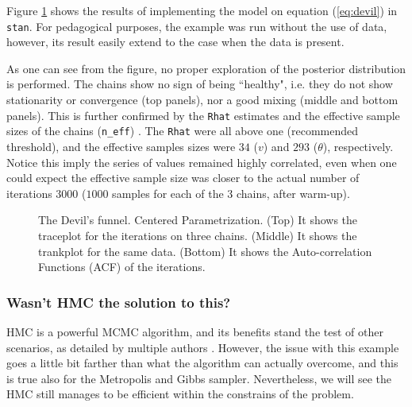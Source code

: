 Figure \ref{fig:devil_CE} shows the results of implementing the model on equation (\ref{eq:devil}) in \texttt{stan}. For pedagogical purposes, the example was run without the use of data, however, its result easily extend to the case when the data is present.

As one can see from the figure, no proper exploration of the posterior distribution is performed. The chains show no sign of being ``healthy", i.e. they do not show stationarity or convergence (top panels), nor a good mixing (middle and bottom panels). This is further confirmed by the \texttt{Rhat} estimates and the effective sample sizes of the chains (\texttt{n\_eff}) \cite{Gelman_et_al_2014}. The \texttt{Rhat} were all above one (recommended threshold), and the effective samples sizes were $34$ ($v$) and $293$ ($\theta$), respectively. Notice this imply the series of values remained highly correlated, even when one could expect the effective sample size was closer to the actual number of iterations $3000$ ($1000$ samples for each of the $3$ chains, after warm-up).
%
\begin{figure}[h]
	\centering
	\begin{subfigure}
		\texttt{[image: 1\_trace\_CE\_simple]}
	\end{subfigure}
	\begin{subfigure}
		\texttt{[image: 1\_trank\_CE\_simple]}
	\end{subfigure}
	\begin{subfigure}
		\texttt{[image: 1\_acf\_CE\_simple]}
	\end{subfigure}
	\caption[The Devil's funnel. Centered Parametrization.]%
	{The Devil's funnel. Centered Parametrization. (Top) It shows the traceplot for the iterations on three chains. (Middle) It shows the trankplot for the same data. (Bottom) It shows the Auto-correlation Functions (ACF) of the iterations.}
	\label{fig:devil_CE}
\end{figure}


\subsubsection{Wasn't HMC the solution to this?}

HMC is a powerful MCMC algorithm, and its benefits stand the test of other scenarios, as detailed by multiple authors \cite{McElreath_2020, Gelman_et_al_2014}. However, the issue with this example goes a little bit farther than what the algorithm can actually overcome, and this is true also for the Metropolis and Gibbs sampler. Nevertheless, we will see the HMC still manages to be efficient within the constrains of the problem.

